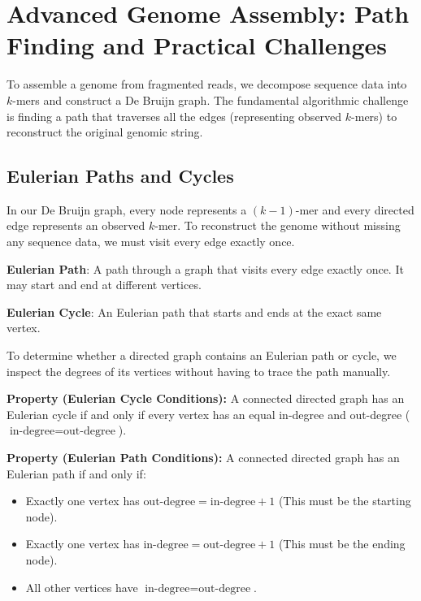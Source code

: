 \documentclass[11pt,a4paper]{article}
\newenvironment{important}{
    \vspace{1em}
    \begin{tcolorbox}[colback=blue!5!white, colframe=blue!75!black, boxrule=1pt, arc=4pt, left=10pt, right=10pt, top=10pt, bottom=10pt]
}{
    \end{tcolorbox}
    \vspace{1em}
}
\newcommand{\sta}{\textbf{[\textasteriskcentered\ CRITICAL NOTE:] }}
\begin{document}
\section{Advanced Genome Assembly: Path Finding and Practical Challenges}

\providecommand{\sta}{\textbf{[*] }}
\newenvironment{important}{\vspace{0.5em}\noindent\begin{center}\fbox{\begin{minipage}{0.95\textwidth}}}{\end{minipage}\end{center}\vspace{0.5em}}

To assemble a genome from fragmented reads, we decompose sequence data into $k$-mers and construct a De Bruijn graph. The fundamental algorithmic challenge is finding a path that traverses all the edges (representing observed $k$-mers) to reconstruct the original genomic string. 

\subsection{Eulerian Paths and Cycles}

In our De Bruijn graph, every node represents a $(k-1)$-mer and every directed edge represents an observed $k$-mer. To reconstruct the genome without missing any sequence data, we must visit every edge exactly once. 

\begin{important}
  \textbf{Eulerian Path}: A path through a graph that visits every edge exactly once. It may start and end at different vertices.
  
  \textbf{Eulerian Cycle}: An Eulerian path that starts and ends at the exact same vertex.
\end{important}

To determine whether a directed graph contains an Eulerian path or cycle, we inspect the degrees of its vertices without having to trace the path manually. 

\textbf{Property (Eulerian Cycle Conditions):}
A connected directed graph has an Eulerian cycle if and only if every vertex has an equal in-degree and out-degree ($\text{in-degree} = \text{out-degree}$).

\textbf{Property (Eulerian Path Conditions):}
A connected directed graph has an Eulerian path if and only if:
\begin{itemize}
    \item Exactly one vertex has $\text{out-degree} = \text{in-degree} + 1$ (This must be the starting node).
    \item Exactly one vertex has $\text{in-degree} = \text{out-degree} + 1$ (This must be the ending node).
    \item All other vertices have $\text{in-degree} = \text{out-degree}$.
\end{itemize}
\end{document}
